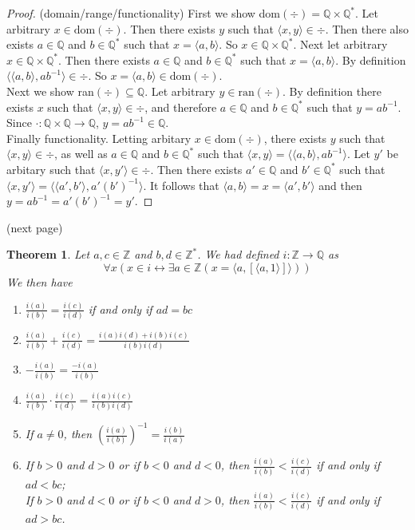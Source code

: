 \documentclass{report}
\newtheorem{theorem}[theo]{Theorem}
\begin{document}
\begin{proof}(domain/range/functionality)
First we show dom$(\div)=\mathbb Q\times\mathbb Q^*$. Let arbitrary $x\in\text{dom}(\div)$.
Then there exists $y$ such that $\langle x,y\rangle\in\div$. Then there also exists $a\in\mathbb Q$ and $b\in\mathbb Q^*$ such that $x=\langle a,b\rangle$. So $x\in\mathbb Q\times\mathbb Q^*$.
Next let arbitrary $x\in\mathbb Q\times\mathbb Q^*$. Then there exists $a\in\mathbb Q$ and $b\in\mathbb Q^*$ such that $x=\langle a,b\rangle$. By definition
$\langle\langle a,b\rangle,ab^{-1}\rangle\in\div$. So $x=\langle a,b\rangle\in\text{dom}(\div)$.\\
\indent Next we show ran$(\div)\subseteq\mathbb Q$. Let arbitrary $y\in\text{ran}(\div)$. By definition there exists $x$ such that $\langle x,y\rangle\in\div$, and therefore
$a\in\mathbb Q$ and $b\in\mathbb Q^*$ such that $y=ab^{-1}$. Since $\cdot:\mathbb Q\times\mathbb Q\to\mathbb Q$, $y=ab^{-1}\in\mathbb Q$.\\
\indent Finally functionality. Letting arbitary $x\in\text{dom}(\div)$,
there exists $y$ such that $\langle x,y\rangle\in\div$, as well as $a\in\mathbb Q$ and $b\in\mathbb Q^*$ such that 
$\langle x,y\rangle=\langle\langle a,b\rangle,ab^{-1}\rangle$.
Let $y'$ be arbitary such that $\langle x,y'\rangle\in\div$. Then there exists 
$a'\in\mathbb Q$ and $b'\in\mathbb Q^*$ such that 
$\langle x,y'\rangle=\langle\langle a',b'\rangle,a'(b')^{-1}\rangle$.
It follows that $\langle a,b\rangle=x=\langle a',b'\rangle$ and then $y=ab^{-1}=a'(b')^{-1}=y'$.
\end{proof}
\noindent(next page)\newpage
\begin{theorem}
Let $a,c\in\mathbb Z$ and $b,d\in\mathbb Z^*$. We had defined $i:\mathbb Z\to\mathbb Q$ as
\begin{equation*}
\forall x(x\in i\leftrightarrow\exists a\in\mathbb Z(x=\langle a,[\langle a,1\rangle]\rangle))
\end{equation*}
We then have
\begin{enumerate}
\item$\frac{i(a)}{i(b)}=\frac{i(c)}{i(d)}$ if and only if $ad=bc$
\item$\frac{i(a)}{i(b)}+\frac{i(c)}{i(d)}=\frac{i(a)i(d)+i(b)i(c)}{i(b)i(d)}$
\item$-\frac{i(a)}{i(b)}=\frac{-i(a)}{i(b)}$
\item$\frac{i(a)}{i(b)}\cdot\frac{i(c)}{i(d)}=\frac{i(a)i(c)}{i(b)i(d)}$
\item If $a\neq0$, then $\left(\frac{i(a)}{i(b)}\right)^{-1}=\frac{i(b)}{i(a)}$
\item If $b>0$ and $d>0$ or if $b<0$ and $d<0$, then $\frac{i(a)}{i(b)}<\frac{i(c)}{i(d)}$ if and only if $ad<bc$;\\
If $b>0$ and $d<0$ or if $b<0$ and $d>0$, then $\frac{i(a)}{i(b)}<\frac{i(c)}{i(d)}$ if and only if $ad>bc$.
\end{enumerate}
\end{theorem}
\end{document}
